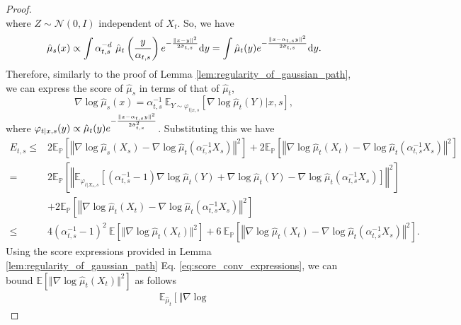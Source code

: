 \begin{proof}
\begin{equation*}
\end{equation*}
where $Z\sim \mathcal{N}(0, I)$ independent of $X_t$. So, we have
\begin{equation*}
    \hat{\mu}_s(x) \propto \int \alpha_{t, s}^{-d} \ \hat{\mu}_t\left(\frac{y}{\alpha_{t,s}}\right) e^{-\frac{\Vert x-y\Vert^2}{2\Tilde{\sigma}_{t,s}}} \mathrm{d} y = \int \hat{\mu}_t(y)e^{-\frac{\Vert x-\alpha_{t, s}y\Vert^2}{2\Tilde{\sigma}_{t,s}}} \mathrm{d} y.
\end{equation*}
Therefore, similarly to the proof of Lemma  \ref{lem:regularity_of_gaussian_path}, we can express the score of $\hat{\mu}_s$ in terms of that of $\hat{\mu}_t$,
\begin{equation*}
    \nabla\log\hat{\mu}_s (x) = \alpha_{t,s}^{-1} \ \mathbb{E}_{Y\sim\varphi_{t| x, s}} \left[\nabla \log \hat{\mu}_t(Y)| x, s\right],
\end{equation*}
where $\varphi_{t| x,s}(y)\propto \hat{\mu}_t(y)e^{-\frac{\Vert x - \alpha_{t,s}y\Vert^2}{2\Tilde{\sigma}_{t,s}^2}}$.
Substituting this we have
\begin{align}
    E_{t, s} \leq& 2 \mathbb{E}_{\mathbb{P}}\left[\left\Vert \nabla\log \hat{\mu}_s(X_s) - \nabla\log \hat{\mu}_t(\alpha_{t, s}^{-1}X_s)\right\Vert^2\right] + 2 \mathbb{E}_{\mathbb{P}}\left[\left\Vert \nabla\log \hat{\mu}_t(X_t) - \nabla\log \hat{\mu}_t(\alpha_{t, s}^{-1}X_s)\right\Vert^2\right] \nonumber \\
    =& 2 \mathbb{E}_{\mathbb{P}}\left[\left \Vert \mathbb{E}_{\varphi_{t|X_s,s}}\left[(\alpha_{t,s}^{-1}-1)\nabla \log \hat{\mu}_t(Y) + \nabla\log \hat{\mu}_t(Y) - \nabla\log\hat{\mu}_{t}(\alpha_{t,s}^{-1}X_s)\right]\right\Vert^2\right] \nonumber\\
    & +  2 \mathbb{E}_{\mathbb{P}}\left[\left\Vert \nabla\log \hat{\mu}_t(X_t) - \nabla\log \hat{\mu}_t(\alpha_{t, s}^{-1}X_s)\right\Vert^2\right] \nonumber\\
    \leq & 4(\alpha_{t,s}^{-1} -1)^2 \ \mathbb{E} \left[\Vert \nabla\log \hat{\mu}_t(X_t)\Vert^2\right] + 6 \ \mathbb{E}_{\mathbb{P}}\left[\left\Vert \nabla\log \hat{\mu}_t(X_t) - \nabla\log \hat{\mu}_t(\alpha_{t, s}^{-1}X_s)\right\Vert^2\right]. \label{eq:auxiliary_time_space_discretisation_error}
\end{align}
Using the score expressions provided in Lemma \ref{lem:regularity_of_gaussian_path} Eq. \eqref{eq:score_conv_expressions}, we can bound $\mathbb{E} \left[\Vert \nabla\log \hat{\mu}_t(X_t)\Vert^2\right]$ as follows
\begin{align*}
    \mathbb{E}_{\hat{\mu}_t}\left[\Vert \nabla\log 

\end{align*}
\end{proof}
